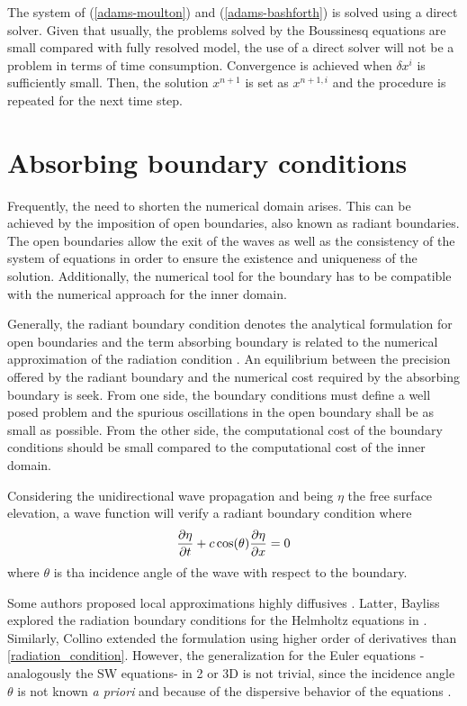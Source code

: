 The system of (\ref{adams-moulton}) and (\ref{adams-bashforth}) is solved using a direct solver. Given that usually, the problems solved by the Boussinesq equations are small compared with fully resolved model, the use of a direct solver will not be a problem in terms of time consumption.
Convergence is achieved when $\delta x^i$ is sufficiently small. Then, the solution $x^{n+1}$ is set as $x^{n+1,i}$ and the procedure is repeated for the next time step.





\section{Absorbing boundary conditions}
\label{eulerian_bsq_absorbing}


Frequently, the need to shorten the numerical domain arises. This can be achieved by the imposition of open boundaries, also known as radiant boundaries. The open boundaries allow the exit of the waves as well as the consistency of the system of equations in order to ensure the existence and uniqueness of the solution. Additionally, the numerical tool for the boundary has to be compatible with the numerical approach for the inner domain.

Generally, the radiant boundary condition denotes the analytical formulation for open boundaries and the term absorbing boundary is related to the numerical approximation of the radiation condition \cite{navon2004}. An equilibrium between the precision offered by the radiant boundary and the numerical cost required by the absorbing boundary is seek.
From one side, the boundary conditions must define a well posed problem and the spurious oscillations in the open boundary shall be as small as possible. From the other side, the computational cost of the boundary conditions should be small compared to the computational cost of the inner domain.

Considering the unidirectional wave propagation and being $\eta$ the free surface elevation, a wave function will verify a radiant boundary condition where
\begin{equation} \label{radiation_condition}
    \frac{\partial\eta}{\partial t} + c \cos(\theta)\frac{\partial\eta}{\partial x} = 0
\end{equation}
where $\theta$ is tha incidence angle of the wave with respect to the boundary.

Some authors proposed local approximations highly diffusives \cite{engquist1977}. Latter, Bayliss explored the radiation boundary conditions for the Helmholtz equations in \cite{bayliss1982}.
Similarly, Collino \cite{collino1993} extended the formulation using higher order of derivatives than \ref{radiation_condition}. However, the generalization for the Euler equations -analogously the SW equations- in 2 or 3D is not trivial, since the incidence angle $\theta$ is not known \emph{a priori} and because of the dispersive behavior of the equations \cite{wei1995}.

